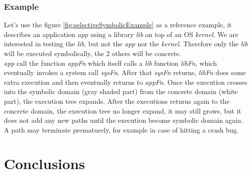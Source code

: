 \documentclass[11pt]{IEEEtran}
\begin{document}
    	\subsubsection{Example}
    	\label{subsec:S2EExample}
    		Let's use the figure \ref{fig:selectiveSymbolicExample} as a reference example, it describes an application \emph{app} using a library \emph{lib} on top of an OS \emph{kernel}. We are interested in testing the \emph{lib}, but not the \emph{app} nor the \emph{kernel}. Therefore only the \emph{lib} will be executed symbolically, the 2 others will be concrete.\\

    		\emph{app} call the function \emph{appFn} which itself calls a \emph{lib} function \emph{libFn}, which eventually invokes a system call \emph{sysFn}. After that \emph{sysFn} returns, \emph{libFn} does some extra execution and then eventually returns to \emph{appFn}. Once the execution crosses into the symbolic domain (gray shaded part) from the concrete domain (white part), the execution tree expands. After the executions returns again to the concrete domain, the execution tree no longer expand, it may still grows, but it does not add any new paths until the execution become symbolic domain again. A path may terminate prematurely, for example in case of hitting a crash bug.


  \section{Conclusions}


\pagebreak
{}

\end{document}
